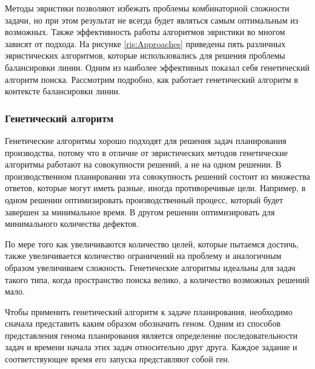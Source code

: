 Методы эвристики позволяют избежать проблемы комбинаторной сложности задачи, но при этом результат не всегда будет являться самым оптимальным из возможных. Также эффективность работы алгоритмов эвристики во многом зависят от подхода. На рисунке \ref{ris:Approaches} приведены пять различных эвристических алгоритмов, которые использовались для решения проблемы балансировки линии. Одним из наиболее эффективных показал себя генетический алгоритм поиска. Рассмотрим подробно, как работает генетический алгоритм в контексте балансировки линии.

\subsubsection*{Генетический алгоритм}

Генетические алгоритмы хорошо подходят для решения задач планирования производства, потому что в отличие от эвристических методов генетические алгоритмы работают на совокупности решений, а не на одном решении. В производственном планировании эта совокупность решений состоит из множества ответов, которые могут иметь разные, иногда противоречивые цели. Например, в одном решении оптимизировать производственный процесс, который будет завершен за минимальное время. В другом решении оптимизировать для минимального количества дефектов.

По мере того как увеличиваются количество целей, которые пытаемся достичь, также увеличивается количество ограничений на проблему и аналогичным образом увеличиваем сложность. Генетические алгоритмы идеальны для задач такого типа, когда пространство поиска велико, а количество возможных решений мало.

Чтобы применить генетический алгоритм к задаче планирования, необходимо сначала представить каким образом обозначить геном. Одним из способов представления генома планирования является определение последовательности задач и времени начала этих задач относительно друг друга. Каждое задание и соответствующее время его запуска представляют собой ген.

